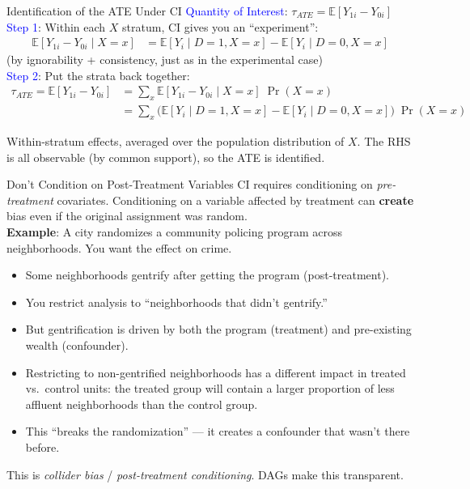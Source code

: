 \documentclass[xcolor=dvipsnames]{beamer}
\newcommand\E{\mathbb{E}}
\begin{document}
\begin{frame}[t]{Identification of the ATE Under CI}
\small
{} \textcolor{Blue}{Quantity of Interest}: $\tau_{ATE} = \E[Y_{1i} - Y_{0i}]$\\[8pt]

 \textcolor{Blue}{Step 1}: Within each $X$ stratum, CI gives you an ``experiment'':
\footnotesize
\begin{align*}
\E[Y_{1i} - Y_{0i} \mid X\!=\!x] &= \E[Y_i \mid D\!=\!1, X\!=\!x] - \E[Y_i \mid D\!=\!0, X\!=\!x]
\end{align*}
\small (by ignorability + consistency, just as in the experimental case)\\

\bigskip
{} \textcolor{Blue}{Step 2}: Put the strata back together:
\footnotesize
\begin{align*}
\tau_{ATE} = \E[Y_{1i} - Y_{0i}] &= \sum_x \E[Y_{1i} - Y_{0i} \mid X\!=\!x]\;\Pr(X\!=\!x)\\
&= \sum_x \big(\E[Y_i \mid D\!=\!1, X\!=\!x] - \E[Y_i \mid D\!=\!0, X\!=\!x]\big)\;\Pr(X\!=\!x)
\end{align*}
\small

 Within-stratum effects, averaged over the population distribution of $X$.  The RHS is all observable (by common support), so the ATE is identified.
\end{frame}


\begin{frame}{Don't Condition on Post-Treatment Variables}
\small
{} CI requires conditioning on \textit{pre-treatment} covariates.  Conditioning on a variable affected by treatment can \textbf{create} bias even if the original assignment was random.\\

\bigskip
{} \textbf{Example}: A city randomizes a community policing program across neighborhoods.  You want the effect on crime.\\
\begin{itemize}
\footnotesize
\item<3-> Some neighborhoods gentrify after getting the program (post-treatment).
\item<4-> You restrict analysis to ``neighborhoods that didn't gentrify.''
\item<5-> But gentrification is driven by both the program (treatment) and pre-existing wealth (confounder).
\item<6-> Restricting to non-gentrified neighborhoods has a different impact in treated vs.\ control units: the treated group will contain a larger proportion of less affluent neighborhoods than the control group.
\item<7-> This ``breaks the randomization'' --- it creates a confounder that wasn't there before.
\end{itemize}

\bigskip
{} \footnotesize This is \textit{collider bias} / \textit{post-treatment conditioning}.  DAGs make this transparent.
\end{frame}
\end{document}
